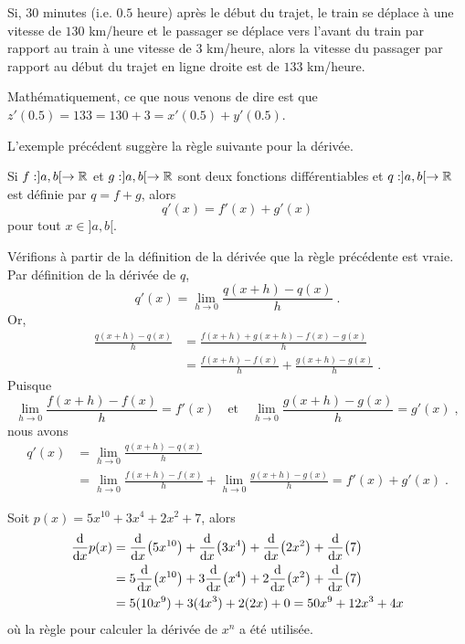 {\begin{egg}
Si, $30$ minutes (i.e. $0.5$ heure) après le début du trajet, le train
se déplace à une vitesse de $130$ km/heure et le passager se déplace 
vers l'avant du train par rapport au train à une vitesse de $3$
km/heure, alors la vitesse du passager par rapport au début du trajet
en ligne droite est de $133$ km/heure.

Mathématiquement, ce que nous venons de dire est que
$z'(0.5) = 133 = 130 + 3 = x'(0.5) + y'(0.5)$.
\end{egg}

L'exemple précédent suggère la règle suivante pour la dérivée.

\begin{theorem}
Si $f:]a,b[\rightarrow \RR$ et $g:]a,b[\rightarrow \RR$ sont deux
fonctions différentiables et $q:]a,b[\rightarrow \RR$ est définie par
$q=f+g$, alors
\[
q'(x) = f'(x) + g'(x)
\]
pour tout $x\in ]a,b[$.
\end{theorem}

Vérifions à partir de la définition de la dérivée que la règle
précédente est vraie.  Par définition de la dérivée de $q$,
\[
q'(x) = \lim_{h\rightarrow 0} \frac{q(x+h)-q(x)}{h} \; .
\]
Or,
\begin{align*}
\frac{q(x+h)-q(x)}{h} &= \frac{f(x+h)+g(x+h) - f(x) - g(x)}{h} \\
&= \frac{f(x+h)- f(x)}{h} + \frac{g(x+h) - g(x)}{h} \; .
\end{align*}
Puisque
\[
\lim_{h\rightarrow 0} \frac{f(x+h)- f(x)}{h} = f'(x)
\quad \text{et} \quad
\lim_{h\rightarrow 0} \frac{g(x+h)- g(x)}{h} = g'(x) \; ,
\]
nous avons
\begin{align*}
q'(x) &= \lim_{h\rightarrow 0} \frac{q(x+h)-q(x)}{h} \\
&= \lim_{h\rightarrow 0} \frac{f(x+h)- f(x)}{h}  + 
\lim_{h\rightarrow 0} \frac{g(x+h)- g(x)}{h} = f'(x) + g'(x) \; .
\end{align*}

\begin{egg}
Soit $p(x) = 5x^{10} + 3x^4 + 2x^2 +7$, alors
\begin{align*}
\dfdx{p(x)}{x} &= \dfdx{\big(5x^{10}\big)}{x}
+ \dfdx{\big(3x^4\big)}{x} + \dfdx{\big(2x^2\big)}{x}
+ \dfdx{\big(7\big)}{x} \\
&= 5\dfdx{\big(x^{10}\big)}{x} + 3\dfdx{\big(x^4\big)}{x}
+ 2\dfdx{\big(x^2\big)}{x} + \dfdx{\big(7\big)}{x} \\
&= 5(10x^9) + 3(4x^3) + 2(2x) + 0 = 50x^9 + 12x^3 + 4x
\end{align*}
où la règle pour calculer la dérivée de $x^n$ a été utilisée.
\end{egg}

}
